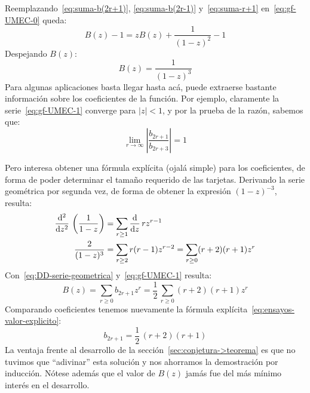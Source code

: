   Reemplazando~\eqref{eq:suma-b(2r+1)}, \eqref{eq:suma-b(2r-1)}
  y~\eqref{eq:suma-r+1} en~\eqref{eq:gf-UMEC-0} queda:
  \begin{equation*}
    B(z) - 1
      = z B(z) + \frac{1}{(1 - z)^2} - 1
  \end{equation*}
  Despejando \(B(z)\):
  \begin{equation}
    \label{eq:gf-UMEC-1}
    B(z) = \frac{1}{(1 - z)^3}
  \end{equation}
  Para algunas aplicaciones basta llegar hasta acá,
  puede extraerse bastante información sobre los coeficientes
  de la función.
  Por ejemplo,
  claramente la serie~\eqref{eq:gf-UMEC-1}
  converge para \(\lvert z \rvert < 1\),
  y por la prueba de la razón,%
  sabemos que:
  \begin{equation*}
    \lim_{r \rightarrow \infty}
	  \left\lvert
	    \frac{b_{2 r + 1}}{b_{2 r + 3}}
	  \right\rvert = 1
  \end{equation*}

  Pero interesa obtener una fórmula explícita
  (ojalá simple)
  para los coeficientes,
  de forma de poder determinar el tamaño requerido de las tarjetas.
  Derivando la serie geométrica por segunda vez,
  de forma de obtener la expresión \((1 - z)^{-3}\),
  resulta:
  \begin{align}
    \frac{\mathrm{d}^2}{\mathrm{d} z^2}
      \, \left( \frac{1}{1 - z} \right)
      &= \sum_{r \ge 1}
	   \frac{\mathrm{d}}{\mathrm{d} z} \, r z^{r - 1}
	   \notag \\
    \frac{2}{(1 - z)^3}
      &= \sum_{r \ge 2} r (r - 1) z^{r - 2}
       = \sum_{r \ge 0} (r + 2) (r + 1) z^r
	   \label{eq:DD-serie-geometrica}
  \end{align}
  Con~\eqref{eq:DD-serie-geometrica} y~\eqref{eq:gf-UMEC-1} resulta:
  \begin{equation}
    \label{eq:gf-UMEC-2}
    B(z)
      = \sum_{r \ge 0} b_{2 r + 1} z^r
      = \frac{1}{2} \, \sum_{r \ge 0} (r + 2) (r + 1) z^r
  \end{equation}
  Comparando coeficientes
  tenemos nuevamente
  la fórmula explícita~\eqref{eq:ensayos-valor-explicito}:
  \begin{equation*}
    b_{2 r + 1} = \frac{1}{2} \, (r + 2) (r + 1)
  \end{equation*}
  La ventaja frente al desarrollo
  de la sección~\ref{sec:conjetura->teorema}
  es que no tuvimos que ``adivinar'' esta solución
  y nos ahorramos la demostración por inducción.
  Nótese además que el valor de \(B(z)\)
  jamás fue del más mínimo interés en el desarrollo.

